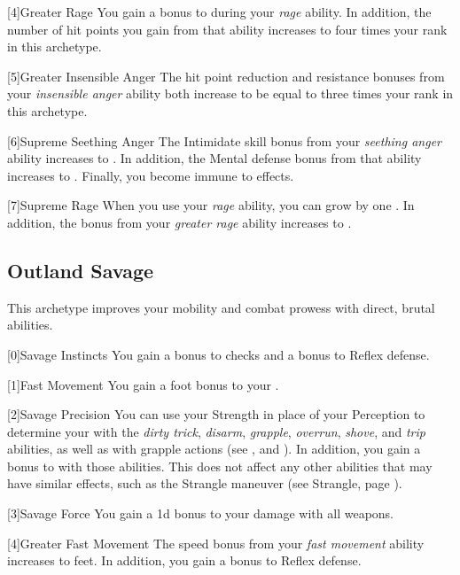         [4]{Greater Rage} You gain a  bonus to  during your \textit{rage} ability.
        In addition, the number of hit points you gain from that ability increases to four times your rank in this archetype.

        [5]{Greater Insensible Anger} The hit point reduction and resistance bonuses from your \textit{insensible anger} ability both increase to be equal to three times your rank in this archetype.

        [6]{Supreme Seething Anger} The Intimidate skill bonus from your \textit{seething anger} ability increases to .
        In addition, the Mental defense bonus from that ability increases to .
        Finally, you become immune to  effects.

        [7]{Supreme Rage} When you use your \textit{rage} ability, you can grow by one .
        In addition, the  bonus from your \textit{greater rage} ability increases to .

    \newpage
    \subsection{Outland Savage}
        This archetype improves your mobility and combat prowess with direct, brutal abilities.

        [0]{Savage Instincts} You gain a  bonus to  checks and a  bonus to Reflex defense.

        [1]{Fast Movement} You gain a  foot bonus to your .

        [2]{Savage Precision} You can use your Strength in place of your Perception to determine your  with the \textit{dirty trick}, \textit{disarm}, \textit{grapple}, \textit{overrun}, \textit{shove}, and \textit{trip} abilities, as well as with grapple actions (see , and ).
        In addition, you gain a  bonus to  with those abilities.
        This does not affect any other abilities that may have similar effects, such as the Strangle maneuver (see Strangle, page ).

        [3]{Savage Force} You gain a \plus1d bonus to your damage with all weapons.

        [4]{Greater Fast Movement} The speed bonus from your \textit{fast movement} ability increases to  feet.
        In addition, you gain a  bonus to Reflex defense.


